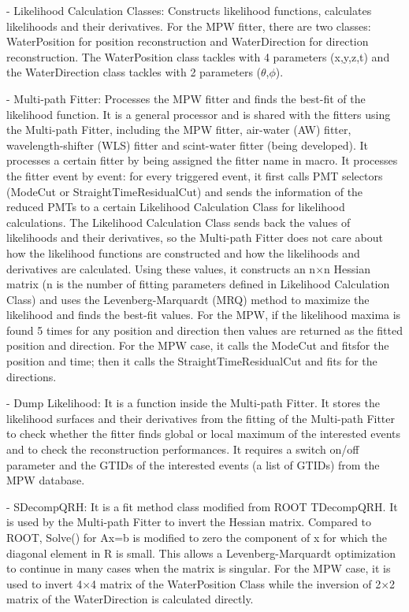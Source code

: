 	
	- Likelihood Calculation Classes: Constructs likelihood functions, calculates likelihoods and their derivatives. For the MPW fitter, there are two classes: WaterPosition for position reconstruction and WaterDirection for direction reconstruction. The WaterPosition class tackles with 4 parameters (x,y,z,t) and the WaterDirection class tackles with 2 parameters ($\theta$,$\phi$). 
	
	- Multi-path Fitter: Processes the MPW fitter and finds the best-fit of the likelihood function. It is a general processor and is shared with the fitters using the Multi-path Fitter, including the MPW fitter, air-water (AW) fitter, wavelength-shifter (WLS) fitter and scint-water fitter (being developed). It processes a certain fitter by being assigned the fitter name in macro. It processes the fitter event by event: for every triggered event, it first calls PMT selectors (ModeCut or StraightTimeResidualCut) and sends the information of the reduced PMTs to a certain Likelihood Calculation Class for likelihood calculations. The Likelihood Calculation Class sends back the values of likelihoods and their derivatives, so the Multi-path Fitter does not care about how the likelihood functions are constructed and how the likelihoods and derivatives are calculated. Using these values, it constructs an n$\times$n Hessian matrix (n is the number of fitting parameters defined in Likelihood Calculation Class) and uses the Levenberg-Marquardt (MRQ) method to maximize the likelihood and finds the best-fit values. For the MPW, if the likelihood maxima is found 5 times for any position and direction then values are returned as the fitted position and direction. For the MPW case, it calls the ModeCut and fitsfor the position and time; then it calls the StraightTimeResidualCut and fits for the directions.
	
	- Dump Likelihood: It is a function inside the Multi-path Fitter. It stores the likelihood surfaces and their derivatives from the fitting of the Multi-path Fitter to check whether the fitter finds global or local maximum of the interested events and to check the reconstruction performances. It requires a switch on/off parameter and the GTIDs of the interested events (a list of GTIDs) from the MPW database.
	
	- SDecompQRH: It is a fit method class modified from ROOT TDecompQRH. It is used by the Multi-path Fitter to invert the Hessian matrix. Compared to ROOT, Solve() for Ax=b is modified to zero the component of x for which the diagonal element in R is small. This allows a Levenberg-Marquardt optimization to continue in many cases
	when the matrix is singular. For the MPW case, it is used to invert 4$\times$4 matrix of the WaterPosition Class while the inversion of 2$\times$2 matrix of the WaterDirection is calculated directly.
	
